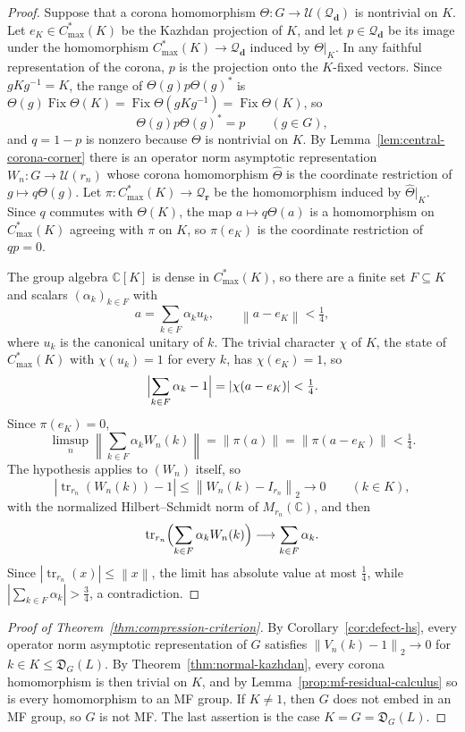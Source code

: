\documentclass[11pt]{amsart}
\theoremstyle{plain}
\newcommand{\C}{\mathbb C}
\newcommand{\U}{\mathcal U}
\newcommand{\tr}{\operatorname{tr}}
\newcommand{\opnorm}[1]{\left\lVert #1\right\rVert}
\newcommand{\hsnorm}[1]{\left\lVert #1\right\rVert_2}
\begin{document}
\begin{proof}
Suppose that a corona homomorphism
\(\Theta\colon G\to\U(\mathcal Q_{\mathbf d})\) is nontrivial on \(K\).
Let \(e_K\in C^*_{\max}(K)\) be the Kazhdan projection of \(K\), and let
\(p\in\mathcal Q_{\mathbf d}\) be its image under the homomorphism
\(C^*_{\max}(K)\to\mathcal Q_{\mathbf d}\) induced by \(\Theta|_K\).  In
any faithful representation of the corona, \(p\) is the projection onto
the \(K\)-fixed vectors.  Since \(gKg^{-1}=K\), the range of
\(\Theta(g)p\Theta(g)^*\) is
\(\Theta(g)\operatorname{Fix}\Theta(K)
=\operatorname{Fix}\Theta(gKg^{-1})=\operatorname{Fix}\Theta(K)\), so
\[
 \Theta(g)p\Theta(g)^*=p\qquad(g\in G),
\]
and \(q=1-p\) is nonzero because \(\Theta\) is nontrivial on \(K\).  By
Lemma~\ref{lem:central-corona-corner} there is an operator norm
asymptotic representation \(W_n\colon G\to\U(r_n)\) whose corona
homomorphism \(\widehat\Theta\) is the coordinate restriction of
\(g\mapsto q\Theta(g)\).  Let
\(\pi\colon C^*_{\max}(K)\to\mathcal Q_{\mathbf r}\) be the homomorphism
induced by \(\widehat\Theta|_K\).  Since \(q\) commutes with \(\Theta(K)\),
the map \(a\mapsto q\Theta(a)\) is a homomorphism on \(C^*_{\max}(K)\)
agreeing with \(\pi\) on \(K\), so \(\pi(e_K)\) is the coordinate
restriction of \(qp=0\).

The group algebra \(\C[K]\) is dense in \(C^*_{\max}(K)\), so there are
a finite set \(F\subseteq K\) and scalars \((\alpha_k)_{k\in F}\) with
\[
 a=\sum_{k\in F}\alpha_k u_k,
 \qquad \opnorm{a-e_K}<\tfrac14,
\]
where \(u_k\) is the canonical unitary of \(k\).  The trivial character
\(\chi\) of \(K\), the state of \(C^*_{\max}(K)\) with \(\chi(u_k)=1\)
for every \(k\), has \(\chi(e_K)=1\), so
\[
 \Bigl|\sum_{k\in F}\alpha_k-1\Bigr|=|\chi(a-e_K)|<\tfrac14.
\]
Since \(\pi(e_K)=0\),
\[
 \limsup_n\opnorm{\sum_{k\in F}\alpha_kW_n(k)}
 =\opnorm{\pi(a)}=\opnorm{\pi(a-e_K)}<\tfrac14.
\]
The hypothesis applies to \((W_n)\) itself, so
\[
 |\tr_{r_n}(W_n(k))-1|\le\hsnorm{W_n(k)-I_{r_n}}\longrightarrow0
 \qquad(k\in K),
\]
with the normalized Hilbert--Schmidt norm of \(M_{r_n}(\C)\), and then
\[
 \tr_{r_n}\Bigl(\sum_{k\in F}\alpha_kW_n(k)\Bigr)
 \longrightarrow\sum_{k\in F}\alpha_k.
\]
Since \(|\tr_{r_n}(x)|\le\opnorm{x}\), the limit has absolute value at
most \(\tfrac14\), while \(|\sum_{k\in F}\alpha_k|>\tfrac34\), a
contradiction.
\end{proof}

\begin{proof}[Proof of Theorem~\ref{thm:compression-criterion}]
By Corollary~\ref{cor:defect-hs}, every operator norm asymptotic
representation of \(G\) satisfies \(\hsnorm{V_n(k)-1}\to0\) for
\(k\in K\le\mathfrak D_G(L)\).  By Theorem~\ref{thm:normal-kazhdan}, every
corona homomorphism is then trivial on \(K\), and by
Lemma~\ref{prop:mf-residual-calculus} so is every homomorphism to an MF
group.  If \(K\ne1\), then \(G\) does not embed in an MF group, so \(G\)
is not MF\@.  The last assertion is the case \(K=G=\mathfrak D_G(L)\).
\end{proof}
\end{document}

